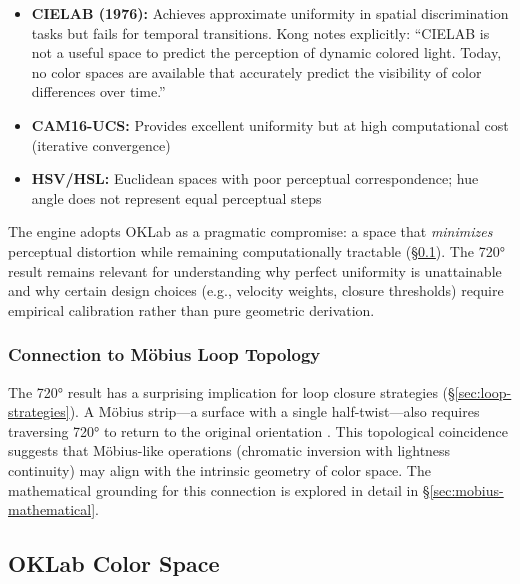 \begin{itemize}
    \item \textbf{CIELAB (1976):} Achieves approximate uniformity in spatial discrimination tasks but fails for temporal transitions. Kong \citeyearpar{kong2021} notes explicitly: ``CIELAB is not a useful space to predict the perception of dynamic colored light. Today, no color spaces are available that accurately predict the visibility of color differences over time.''
    
    \item \textbf{CAM16-UCS:} Provides excellent uniformity but at high computational cost (iterative convergence) \citep{safdar2017}
    
    \item \textbf{HSV/HSL:} Euclidean spaces with poor perceptual correspondence; hue angle does not represent equal perceptual steps
\end{itemize}

The engine adopts OKLab as a pragmatic compromise: a space that \emph{minimizes} perceptual distortion while remaining computationally tractable (\S\ref{sec:oklab-implementation}). The 720° result remains relevant for understanding why perfect uniformity is unattainable and why certain design choices (e.g., velocity weights, closure thresholds) require empirical calibration rather than pure geometric derivation.

\subsubsection{Connection to Möbius Loop Topology}

The 720° result has a surprising implication for loop closure strategies (\S\ref{sec:loop-strategies}). A Möbius strip—a surface with a single half-twist—also requires traversing 720° to return to the original orientation \citep{nolle2012}. This topological coincidence suggests that Möbius-like operations (chromatic inversion with lightness continuity) may align with the intrinsic geometry of color space. The mathematical grounding for this connection is explored in detail in \S\ref{sec:mobius-mathematical}.

\subsection{OKLab Color Space}
\label{sec:oklab-implementation}

